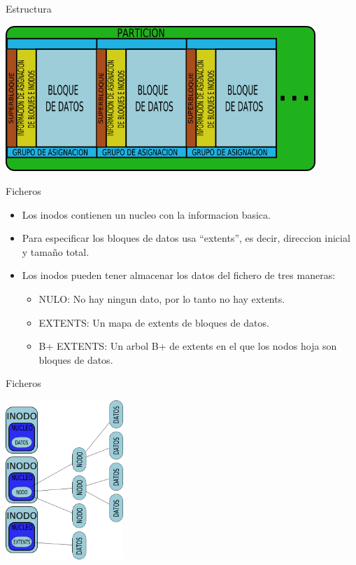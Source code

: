 \begin{frame}{Estructura}
  \begin{center}
    \includegraphics[height=5.5cm]{imgs/xfs_struct.png}
  \end{center}
\end{frame}

\begin{frame}{Ficheros}
  \begin{itemize}
    \item Los inodos contienen un nucleo con la informacion basica.
    \item Para especificar los bloques de datos usa “extents”, es decir, direccion inicial y tamaño total.
    \item Los inodos pueden tener almacenar los datos del fichero de tres maneras:
    \begin{itemize}
      \item NULO: No hay ningun dato, por lo tanto no hay extents.
      \item EXTENTS: Un mapa de extents de bloques de datos.
      \item B+ EXTENTS: Un arbol B+ de extents en el que los nodos hoja son bloques de datos.
    \end{itemize}
  \end{itemize}
\end{frame}

\begin{frame}{Ficheros}
  \begin{center}
    \includegraphics[height=6cm]{imgs/xfs_files.png}
  \end{center}
\end{frame}
